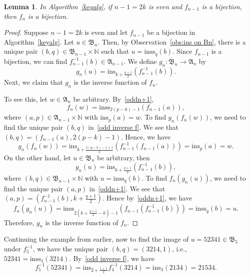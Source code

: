 \documentclass[12pt]{amsart}
\newtheorem{lem}[thm]{Lemma}
\theoremstyle{definition}
\numberwithin{equation}{section}
\newcommand{\ins}[1]{\mathrm{ins}_{#1}}
\newcommand{\inss}[1]{\mathrm{inss}_{#1}}
\begin{document}
\begin{lem}\label{l:even to odd}
    In Algorithm~\ref{keyalg}, if $n-1=2k$ is even and $f_{n-1}$ is a bijection, then $f_{n}$ is a bijection.
\end{lem}
\begin{proof}
    Suppose $n-1=2k$ is even and let $f_{n-1}$ be a bijection in Algorithm~\ref{keyalg}. Let $u\in \mathfrak B_n$. Then, by Observation~\ref{obs:ins on Bn}, there is a unique pair $(b,q) \in \mathfrak B_{n-1} \times \mathbb N$ such that $u = \inss{q}(b)$. Since $f_{n-1}$ is a bijection, we can find $f_{n-1}^{-1}(b) \in \mathfrak A_{n-1}$.
    We define $g_n: \mathfrak B_n \rightarrow \mathfrak A_n$ by
    \begin{equation}\label{odd inverse f}
        g_n(u) = \ins{k+\frac{q+1}{2}}(f_{n-1}^{-1}(b)).
    \end{equation}
    Next, we claim that $g_n$ is the inverse function of $f_n$.

    To see this, let $w \in \mathfrak A_n$ be arbitrary. By~\eqref{oddn+1}, \begin{equation*}
        f_n(w) = \inss{2(p-k)-1} (f_{n-1}(a)),
    \end{equation*}where $(a,p) \in \mathfrak A_{n-1} \times \mathbb N$ with $\ins{p} (a) = w$. To find $g_n(f_n(w))$, we need to find the unique pair $(b,q)$ in~\eqref{odd inverse f}. We see that $(b,q) = (f_{n-1}(a) , 2(p-k)-1)$. Hence, we have \begin{equation*}
        g_n(f_n(w)) = \ins{k+\frac{2(p-k)-1 +1}{2}}(f_{n-1}^{-1} (f_{n-1}(a))) = \ins{p}(a) = w.
    \end{equation*}
    On the other hand, let $u\in \mathfrak B_n$ be arbitrary, then \begin{equation*}
        g_n(u) = \ins{k+\frac{q+1}{2}}(f_{n-1}^{-1}(b)),
    \end{equation*}where $(b,q) \in \mathfrak B_{n-1} \times \mathbb N$ with $u = \inss{q}(b)$. To find $f_n(g_n(u))$, we need to find the unique pair $(a,p)$ in~\eqref{oddn+1}. We see that $(a,p) = (f_{n-1}^{-1}(b), k+ \frac{q+1}{2})$. Hence by~\eqref{oddn+1}, we have \begin{equation*}
        f_n(g_n(u)) = \inss{2(k+\frac{q+1}{2} -k)-1}(f_{n-1}(f_{n-1}^{-1}(b))) = \inss{q} (b) = u.
    \end{equation*}Therefore, $g_n$ is the inverse function of $f_n$.
\end{proof}

Continuing the example from earlier, now to find the image of $u=52341 \in \mathfrak B_5$ under $f_5^{-1}$, we have the unique pair $(b,q) = (3214,1)$, i.e., $52341 = \inss 1 (3214)$. By~\eqref{odd inverse f}, we have \begin{equation*}
    f_5^{-1}(52341) = \ins{2+\frac{1+1}{2}} f_{4}^{-1} (3214) = \ins 3 (2134) = 21534.
\end{equation*}
\end{document}

